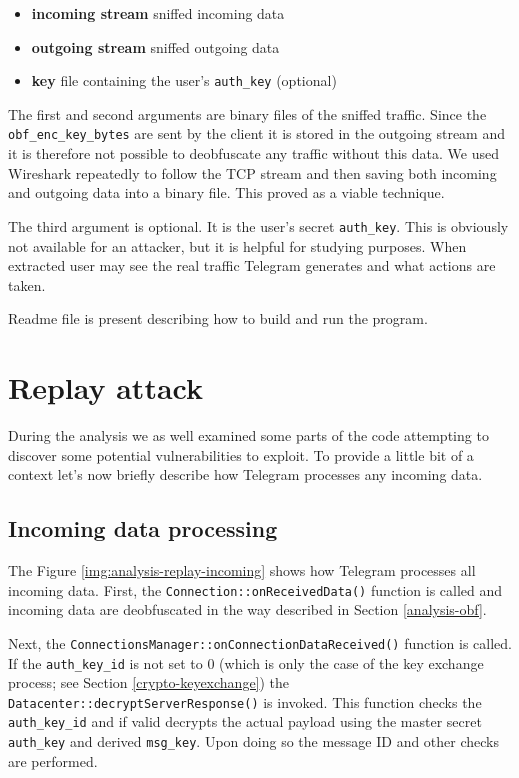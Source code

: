 \documentclass[thesis=M,english]{FITthesis}[2012/10/20]
\begin{document}
\begin{itemize}

	\item \textbf{incoming stream} sniffed incoming data
	\item \textbf{outgoing stream} sniffed outgoing data
	\item \textbf{key} file containing the user's \texttt{auth\_key} (optional)

\end{itemize}

The first and second arguments are binary files of the sniffed traffic. Since the \texttt{obf\_enc\_key\_bytes} are sent by the client it is stored in the outgoing stream and it is therefore not possible to deobfuscate any traffic without this data. We used Wireshark repeatedly to follow the TCP stream and then saving both incoming and outgoing data into a binary file. This proved as a viable technique.

The third argument is optional. It is the user's secret \texttt{auth\_key}. This is obviously not available for an attacker, but it is helpful for studying purposes. When extracted user may see the real traffic Telegram generates and what actions are taken.

Readme file is present describing how to build and run the program.



\section{Replay attack}\label{analysis-attacks}

During the analysis we as well examined some parts of the code attempting to discover some potential vulnerabilities to exploit. To provide a little bit of a context let's now briefly describe how Telegram processes any incoming data.

\subsection{Incoming data processing}

The Figure \ref{img:analysis-replay-incoming} shows how Telegram processes all incoming data. First, the \texttt{Connection::onReceivedData()} function is called and incoming data are deobfuscated in the way described in Section \ref{analysis-obf}.

Next, the \texttt{ConnectionsManager::onConnectionDataReceived()} function is called. If the \texttt{auth\_key\_id} is not set to 0 (which is only the case of the key exchange process; see Section \ref{crypto-keyexchange}) the \texttt{Datacenter::decryptServerResponse()} is invoked. This function checks the \texttt{auth\_key\_id} and if valid decrypts the actual payload using the master secret \texttt{auth\_key} and derived \texttt{msg\_key}. Upon doing so the message ID and other checks are performed.
\end{document}
